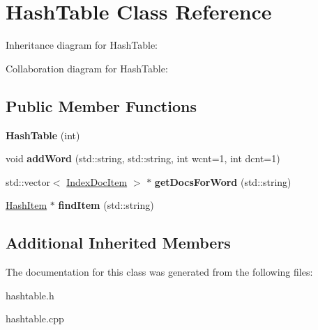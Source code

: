 \hypertarget{classHashTable}{}\section{Hash\+Table Class Reference}
\label{classHashTable}


Inheritance diagram for Hash\+Table\+:


Collaboration diagram for Hash\+Table\+:
\subsection*{Public Member Functions}
\begin{DoxyCompactItemize}
\item 
{\bfseries Hash\+Table} (int)\hypertarget{classHashTable_a655be4719731689e0083bfd914e3a830}{}\label{classHashTable_a655be4719731689e0083bfd914e3a830}

\item 
void {\bfseries add\+Word} (std\+::string, std\+::string, int wcnt=1, int dcnt=1)\hypertarget{classHashTable_a0f29c1df4917a1835f9018c97c61941a}{}\label{classHashTable_a0f29c1df4917a1835f9018c97c61941a}

\item 
std\+::vector$<$ \hyperlink{classIndexDocItem}{Index\+Doc\+Item} $>$ $\ast$ {\bfseries get\+Docs\+For\+Word} (std\+::string)\hypertarget{classHashTable_afd736632c475970121219e13f8de3bb4}{}\label{classHashTable_afd736632c475970121219e13f8de3bb4}

\item 
\hyperlink{classHashItem}{Hash\+Item} $\ast$ {\bfseries find\+Item} (std\+::string)\hypertarget{classHashTable_a3d63151350c5b3721ca8c49a02feeda6}{}\label{classHashTable_a3d63151350c5b3721ca8c49a02feeda6}

\end{DoxyCompactItemize}
\subsection*{Additional Inherited Members}


The documentation for this class was generated from the following files\+:\begin{DoxyCompactItemize}
\item 
hashtable.\+h\item 
hashtable.\+cpp\end{DoxyCompactItemize}
